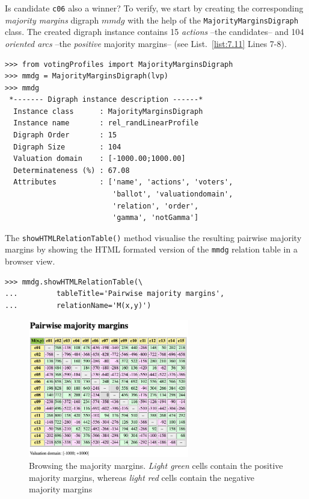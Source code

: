 Is candidate \texttt{c06} also a \Condorcet winner? To verify, we start by creating the corresponding \emph{majority margins} digraph $mmdg$ with the help of the \texttt{MajorityMarginsDi\-graph} class. The created digraph instance contains 15 \emph{actions} --the candidates-- and 104 \emph{oriented arcs} --the \emph{positive} majority margins-- (see List.~\vref{list:7.11} Lines 7-8).
\begin{lstlisting}[caption={A majority margins digraph constructed from a linear voting profile},label=list:7.11]
>>> from votingProfiles import MajorityMarginsDigraph
>>> mmdg = MajorityMarginsDigraph(lvp)
>>> mmdg
 *------- Digraph instance description ------*
  Instance class      : MajorityMarginsDigraph
  Instance name       : rel_randLinearProfile
  Digraph Order       : 15
  Digraph Size        : 104
  Valuation domain    : [-1000.00;1000.00]
  Determinateness (%) : 67.08
  Attributes          : ['name', 'actions', 'voters',
                         'ballot', 'valuationdomain',
                         'relation', 'order',
                         'gamma', 'notGamma']
\end{lstlisting}

The \texttt{showHTMLRelationTable()} method visualise the resulting pairwise majority margins by showing the HTML formated version of the \texttt{mmdg} relation table in a browser view.
\begin{lstlisting}
>>> mmdg.showHTMLRelationTable(\
...         tableTitle='Pairwise majority margins',
...         relationName='M(x,y)')
\end{lstlisting}
\begin{figure}[ht]
\sidecaption[t]
\includegraphics[width=7cm]{Figures/7-4-majorityMargins.png}
\caption[Browsing the majority margins]{Browsing the majority margins. \emph{Light green} cells contain the positive majority margins, whereas \emph{light red} cells contain the negative majority margins}
\label{fig:7.4}       %
\end{figure}

